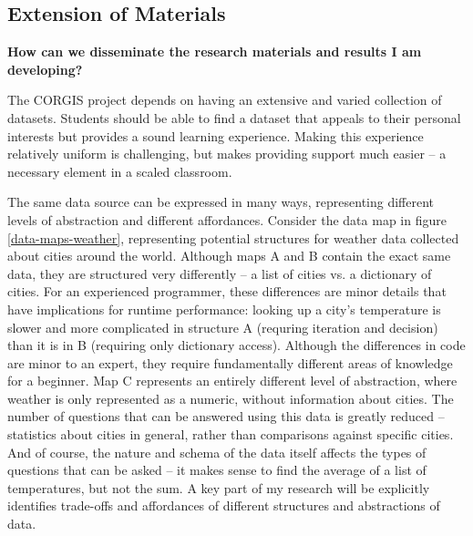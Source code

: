 \subsection{Extension of Materials}

\textbf{How can we disseminate the research materials and results I am developing?}

The CORGIS project depends on having an extensive and varied collection of datasets. 
Students should be able to find a dataset that appeals to their personal interests but provides a sound learning experience.
Making this experience relatively uniform is challenging, but makes providing support much easier -- a necessary element in a scaled classroom.

The same data source can be expressed in many ways, representing different levels of abstraction and different affordances.
Consider the data map in figure \ref{data-maps-weather}, representing potential structures for weather data collected about cities around the world.
Although maps A and B contain the exact same data, they are structured very differently -- a list of cities vs. a dictionary of cities.
For an experienced programmer, these differences are minor details that have implications for runtime performance: looking up a city's temperature is slower and more complicated in structure A (requring iteration and decision) than it is in B (requiring only dictionary access).
Although the differences in code are minor to an expert, they require fundamentally different areas of knowledge for a beginner.
Map C represents an entirely different level of abstraction, where weather is only represented as a numeric, without information about cities.
The number of questions that can be answered using this data is greatly reduced -- statistics about cities in general, rather than comparisons against specific cities.
And of course, the nature and schema of the data itself affects the types of questions that can be asked -- it makes sense to find the average of a list of temperatures, but not the sum.
A key part of my research will be explicitly identifies trade-offs and affordances of different structures and abstractions of data.

